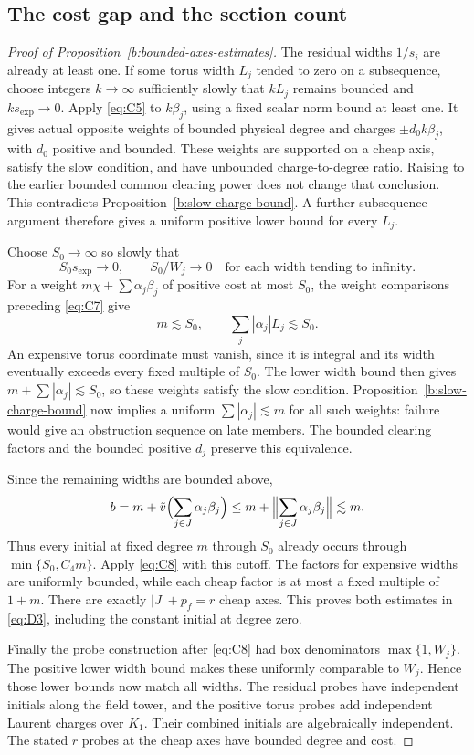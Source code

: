 \subsection{The cost gap and the section count}

\begin{proof}[Proof of Proposition~\ref{b:bounded-axes-estimates}]
The residual widths \(1/s_i\) are already at least one. If some torus
width \(L_j\) tended to zero on a subsequence, choose integers
\(k\to\infty\) sufficiently slowly that \(kL_j\) remains bounded and
\(ks_{\exp}\to0\). Apply \eqref{eq:C5} to \(k\beta_j\), using a fixed
scalar norm bound at least one. It gives actual opposite weights of
bounded physical degree and charges \(\pm d_0k\beta_j\), with
\(d_0\) positive and bounded. These weights are supported on a cheap
axis, satisfy the slow condition, and have unbounded charge-to-degree
ratio. Raising to the earlier bounded common clearing power does not
change that conclusion. This contradicts
Proposition~\ref{b:slow-charge-bound}. A further-subsequence argument
therefore gives a uniform positive lower bound for every \(L_j\).

Choose \(S_0\to\infty\) so slowly that
\[
 S_0s_{\exp}\longrightarrow0,\qquad
 S_0/W_j\longrightarrow0\quad\text{for each width tending to infinity}.
\]
For a weight \(m\chi+\sum\alpha_j\beta_j\) of positive cost at most
\(S_0\), the weight comparisons preceding \eqref{eq:C7} give
\[
 m\lesssim S_0,\qquad
 \sum_j|\alpha_j|L_j\lesssim S_0.
\]
An expensive torus coordinate must vanish, since it is integral and its
width eventually exceeds every fixed multiple of \(S_0\). The lower
width bound then gives
\(m+\sum|\alpha_j|\lesssim S_0\), so these weights satisfy the slow
condition. Proposition~\ref{b:slow-charge-bound} now implies a uniform
\(\sum|\alpha_j|\lesssim m\) for all such weights: failure would give
an obstruction sequence on late members. The bounded clearing factors
and the bounded positive \(d_j\) preserve this equivalence.

Since the remaining widths are bounded above,
\[
 b=m+\tilde v\Bigl(\sum_{j\in J}\alpha_j\beta_j\Bigr)
 \leq m+\Bigl\|\sum_{j\in J}\alpha_j\beta_j\Bigr\|
 \lesssim m.
\]
Thus every initial at fixed degree \(m\) through \(S_0\) already occurs
through \(\min\{S_0,C_4m\}\). Apply \eqref{eq:C8} with this cutoff.
The factors for expensive widths are uniformly bounded, while each cheap
factor is at most a fixed multiple of \(1+m\). There are exactly
\(|J|+p_f=r\) cheap axes. This proves both estimates in \eqref{eq:D3},
including the constant initial at degree zero.

Finally the probe construction after \eqref{eq:C8} had box denominators
\(\max\{1,W_j\}\). The positive lower width bound makes these uniformly
comparable to \(W_j\). Hence those lower bounds now match all widths.
The residual probes have independent initials along the field tower, and
the positive torus probes add independent Laurent charges over \(K_1\).
Their combined initials are algebraically independent. The stated
\(r\) probes at the cheap axes have bounded degree and cost.
\end{proof}

